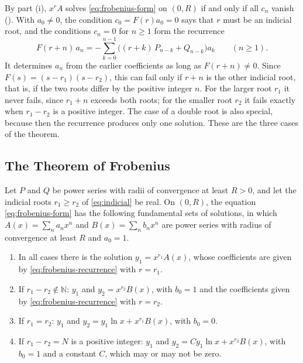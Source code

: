 By part (i), $x^rA$ solves \eqref{eq:frobenius-form} on $(0,R)$ if and only if all $c_n$ vanish (). With $a_0\ne0$, the condition $c_0=F(r)a_0=0$ says that $r$ must be an indicial root, and the conditions $c_n=0$ for $n\ge1$ form the recurrence
\begin{equation}
F(r+n)\,a_n=-\sum_{k=0}^{n-1}\bigl((r+k)\,P_{n-k}+Q_{n-k}\bigr)a_k\qquad(n\ge1).
\label{eq:frobenius-recurrence}
\end{equation}
It determines $a_n$ from the earlier coefficients as long as $F(r+n)\ne0$. Since $F(s)=(s-r_1)(s-r_2)$, this can fail only if $r+n$ is the other indicial root, that is, if the two roots differ by the positive integer $n$. For the larger root $r_1$ it never fails, since $r_1+n$ exceeds both roots; for the smaller root $r_2$ it fails exactly when $r_1-r_2$ is a positive integer. The case of a double root is also special, because then the recurrence produces only one solution. These are the three cases of the theorem.

\subsection{The Theorem of Frobenius}

\begin{theorem}[Frobenius]
\label{thm:frobenius}
Let $P$ and $Q$ be power series with radii of convergence at least $R>0$, and let the indicial roots $r_1\ge r_2$ of \eqref{eq:indicial} be real. On $(0,R)$, the equation \eqref{eq:frobenius-form} has the following fundamental sets of solutions, in which $A(x)=\sum_na_nx^n$ and $B(x)=\sum_nb_nx^n$ are power series with radius of convergence at least $R$ and $a_0=1$.
\begin{enumerate}
\item In all cases there is the solution $y_1=x^{r_1}A(x)$, whose coefficients are given by \eqref{eq:frobenius-recurrence} with $r=r_1$.
\item If $r_1-r_2\notin\mathbb N$: $y_1$ and $y_2=x^{r_2}B(x)$, with $b_0=1$ and the coefficients given by \eqref{eq:frobenius-recurrence} with $r=r_2$.
\item If $r_1=r_2$: $y_1$ and $y_2=y_1\ln x+x^{r_1}B(x)$, with $b_0=0$.
\item If $r_1-r_2=N$ is a positive integer: $y_1$ and $y_2=Cy_1\ln x+x^{r_2}B(x)$, with $b_0=1$ and a constant $C$, which may or may not be zero.
\end{enumerate}
\end{theorem}

